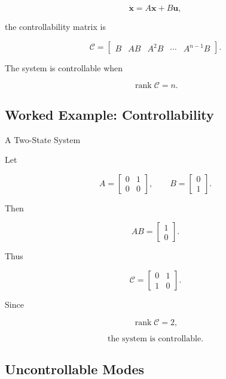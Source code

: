 \[
\dot{\mathbf{x}}
=
A\mathbf{x}
+
B\mathbf{u},
\]

the controllability matrix is

\[
\boxed{
\mathcal{C}
=
\begin{bmatrix}
B & AB & A^2B & \cdots & A^{n-1}B
\end{bmatrix}.
}
\]

The system is controllable when

\[
\boxed{
\operatorname{rank}\mathcal{C}=n.
}
\]

\subsection{Worked Example: Controllability}
\label{subsec:worked-controllability}

\begin{workedexamplebox}{A Two-State System}

Let

\[
A
=
\begin{bmatrix}
0 & 1\\
0 & 0
\end{bmatrix},
\qquad
B
=
\begin{bmatrix}
0\\
1
\end{bmatrix}.
\]

Then

\[
AB
=
\begin{bmatrix}
1\\
0
\end{bmatrix}.
\]

Thus

\[
\mathcal{C}
=
\begin{bmatrix}
0 & 1\\
1 & 0
\end{bmatrix}.
\]

Since

\[
\operatorname{rank}\mathcal{C}=2,
\]

\begin{answerbox}
\[
\boxed{
\text{the system is controllable}.
}
\]
\end{answerbox}

\end{workedexamplebox}

\subsection{Uncontrollable Modes}
\label{subsec:uncontrollable-modes}

